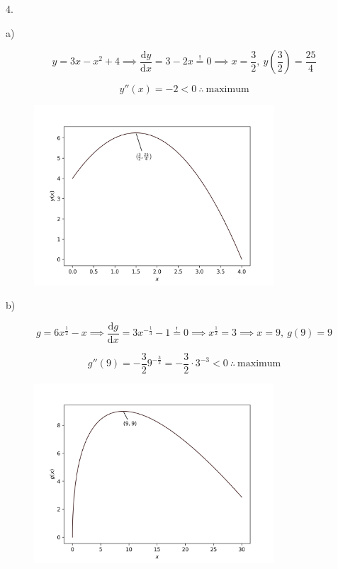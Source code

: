 \documentclass{article}
\newcommand{\dd}[1]{\mathrm{d}#1}
\begin{document}
4.

a)

$$
  y = 3x - x^2 + 4 \implies \frac{\dd y}{\dd x} = 3-2x \overset{!}{=} 0 \implies x = \frac{3}{2}, \: y \left( \frac{3}{2} \right) = \frac{25}{4}
$$

$$
  y''(x) = -2 < 0 \: \therefore \: \text{maximum}
$$

\begin{figure}[H]
  \centering
  \includegraphics[width=0.8\textwidth]{figures/5_Differentiation/QQ4a.png}
\end{figure}

b)

$$
  g = 6x^{\frac{1}{2}} - x \implies \frac{\dd g}{\dd x} = 3x^{-\frac{1}{3}} - 1 \overset{!}{=} 0 \implies x^{\frac{1}{2}} = 3 \implies x = 9, \: g(9) = 9
$$

$$
  g''(9) = -\frac{3}{2} 9^{-\frac{3}{2}} = -\frac{3}{2}\cdot3^{-3} < 0 \: \therefore \: \text{maximum}
$$

\begin{figure}[H]
  \centering
  \includegraphics[width=0.8\textwidth]{figures/5_Differentiation/QQ4b.png}
\end{figure}
\end{document}
